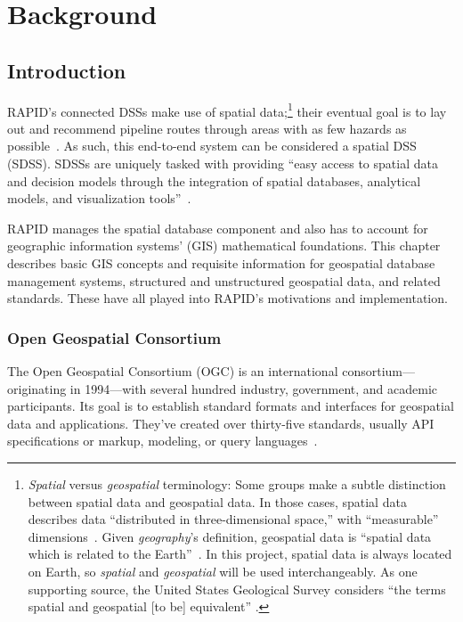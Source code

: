 \chapter{Background}
\label{background}

\section{Introduction}
\label{background_intro}
RAPID's connected DSSs make use of spatial data;\footnote{\textit{Spatial} versus \textit{geospatial} terminology: Some groups make a subtle distinction between spatial data and geospatial data. In those cases, spatial data describes data ``distributed in three-dimensional space,'' with ``measurable'' dimensions~\cite{Bhatta2011}. Given \textit{geography}'s definition, geospatial data is ``spatial data which is related to the Earth''~\cite{Bhatta2011}. In this project, spatial data is always located on Earth, so \textit{spatial} and \textit{geospatial} will be used interchangeably. As one supporting source, the United States Geological Survey considers ``the terms spatial and geospatial [to be] equivalent''
\cite{Bhatta2011}.} their eventual goal is to lay out and recommend pipeline routes through areas with as few hazards as possible~\cite{Dunning2013}. As such, this end-to-end system can be considered a spatial DSS (SDSS). SDSSs are uniquely tasked with providing ``easy access to spatial data and decision models through the integration of spatial databases, analytical models, and visualization tools''~\cite{RedlandsSDSS}.

RAPID manages the spatial database component and also has to account for geographic information systems' (GIS) mathematical foundations. This chapter describes basic GIS concepts and requisite information for geospatial database management systems, structured and unstructured geospatial data, and related standards. These have all played into RAPID's motivations and implementation.

\subsection{Open Geospatial Consortium}
The Open Geospatial Consortium (OGC) is an international consortium---originating in 1994---with several hundred industry, government, and academic participants. Its goal is to establish standard formats and interfaces for geospatial data and applications. They've created over thirty-five standards, usually API specifications or markup, modeling, or query languages~\cite{ogc}.

